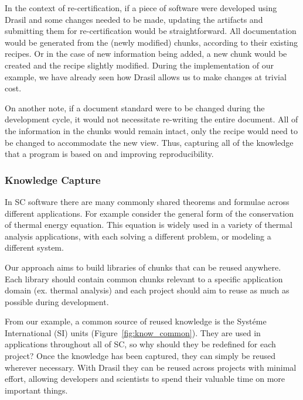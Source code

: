 \documentclass{sig-alternate-05-2015}
\newcommand{\lss}{Drasil}
\begin{document}

In the context of re-certification, if a piece of software were developed using
\lss{} and some changes needed to be made, updating the artifacts and submitting
them for re-certification would be straightforward. All documentation would be
generated from the (newly modified) chunks, according to their existing recipes.
Or in the case of new information being added, a new chunk would be created and
the recipe slightly modified. During the implementation of our example, we have
already seen how \lss{} allows us to make changes at trivial cost.

On another note, if a document standard were to be changed during the
development cycle, it would not necessitate re-writing the entire document. All
of the information in the chunks would remain intact, only the recipe would need
to be changed to accommodate the new view. Thus, capturing all of the knowledge
that a program is based on and improving reproducibility.

\subsubsection{Knowledge Capture} \label{sssec:adv_knowledge}

In SC software there are many commonly shared theorems and formulae across
different applications. For example consider the general form of the
conservation of thermal energy equation. This equation is widely used in a
variety of thermal analysis applications, with each solving a different problem,
or modeling a different system.

Our approach aims to build libraries of chunks that can be reused anywhere. Each
library should contain common chunks relevant to a specific application domain
(ex. thermal analysis) and each project should aim to reuse as much as possible
during development.

From our example, a common source of reused knowledge is the Syst\'{e}me
International (SI) units (Figure~\ref{fig:know_common}). They are used in
applications throughout all of SC, so why should they be redefined for each
project? Once the knowledge has been captured, they can simply be reused
wherever necessary. With \lss{} they can be reused across projects with minimal
effort, allowing developers and scientists to spend their valuable time on more
important things.
\end{document}
